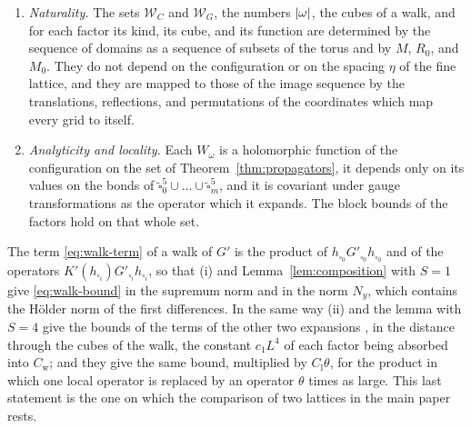 \documentclass[11pt]{preprint}
\DeclarePairedDelimiter{\abs}{\lvert}{\rvert}
\numberwithin{equation}{section}
\begin{document}
\begin{theorem}
\begin{enumerate}[label=(\roman*)]
\begin{equation}\label{eq:walk-factor-product}
    \prod_{i=1}^{n}b_i \leqslant C_{\mathrm l}\bigl(C_{\mathrm w}M^{-1}\bigr)^{\abs\omega}\;,
    \qquad
    \sum_{i=1}^{n}p_i = -4 \text{ for } \mathscr W_C \text{ and } 1 \text{ for } \mathscr W_G\;.
\end{equation}
Moreover, if in one $\mathcal T_i$ the local operator $\mathcal O_i$ is replaced by an operator which satisfies, between the blocks of $X$, $\theta$ times the bounds which Theorem~\ref{thm:propagators} gives for $\mathcal O_i$, with a rate $\delta \geqslant \frac{1}{2}\delta_0$, then $\mathcal T_i$ has the block bound $(C_{\mathrm l}\theta b_i, p_i, \frac{1}{2}\delta_0)$.
\item \emph{Naturality.} The sets $\mathscr W_C$ and $\mathscr W_G$, the numbers $\abs\omega$, the cubes of a walk, and for each factor its kind, its cube, and its function are determined by the sequence of domains as a sequence of subsets of the torus and by $M$, $R_0$, and $M_0$. They do not depend on the configuration or on the spacing $\eta$ of the fine lattice, and they are mapped to those of the image sequence by the translations, reflections, and permutations of the coordinates which map every grid to itself.
\item \emph{Analyticity and locality.} Each $W_\omega$ is a holomorphic function of the configuration on the set of Theorem~\ref{thm:propagators}, it depends only on its values on the bonds of $\tilde\square_0^5 \cup \dots \cup \tilde\square_m^5$, and it is covariant under gauge transformations as the operator which it expands. The block bounds of the factors hold on that whole set.
\end{enumerate}
\end{theorem}

The term \eqref{eq:walk-term} of a walk of $G'$ is the product of $h_{\square_0}G'_{\square_0}h_{\square_0}$ and of the operators $K'(h_{\square_i})G'_{\square_i}h_{\square_i}$, so that (i) and Lemma~\ref{lem:composition} with $S = 1$ give \eqref{eq:walk-bound} in the supremum norm and in the norm $N_y$, which contains the H\"older norm of the first differences. In the same way (ii) and the lemma with $S = 4$ give the bounds of the terms of the other two expansions \cite[(3.99), (3.108)]{BalabanPBG}, in the distance through the cubes of the walk, the constant $c_1L^4$ of each factor being absorbed into $C_{\mathrm w}$; and they give the same bound, multiplied by $C_{\mathrm l}\theta$, for the product in which one local operator is replaced by an operator $\theta$ times as large. This last statement is the one on which the comparison of two lattices in the main paper rests.
\end{document}
